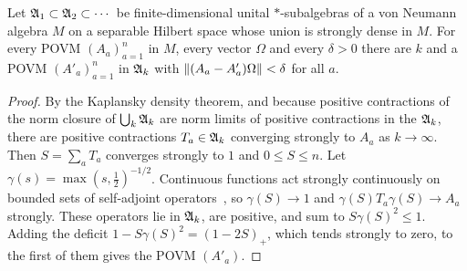 \begin{lemma}\label{lem:local}
Let $\mathfrak{A}_1\subset\mathfrak{A}_2\subset\cdots$ be finite-dimensional unital $*$-subalgebras of a von
Neumann algebra $M$ on a separable Hilbert space whose union is strongly dense in $M$. For every
POVM $(A_a)_{a=1}^n$ in $M$, every vector $\Omega$ and every $\delta>0$ there are $k$ and a POVM
$(A'_a)_{a=1}^n$ in $\mathfrak{A}_k$ with $\lVert (A_a-A'_a)\Omega\rVert<\delta$ for all $a$.
\end{lemma}

\begin{proof}
By the Kaplansky density theorem, and because positive contractions of the norm closure of
$\bigcup_k\mathfrak{A}_k$ are norm limits of positive contractions in the $\mathfrak{A}_k$, there are positive
contractions $T_a\in\mathfrak{A}_k$ converging strongly to $A_a$ as $k\to\infty$. Then $S=\sum_aT_a$
converges strongly to $1$ and $0\le S\le n$. Let $\gamma(s)=\max(s,\tfrac12)^{-1/2}$. Continuous
functions act strongly continuously on bounded sets of self-adjoint
operators~\cite{KadisonRingrose1}, so $\gamma(S)\to1$ and $\gamma(S)T_a\gamma(S)\to A_a$
strongly. These operators lie in $\mathfrak{A}_k$, are positive, and sum to $S\gamma(S)^2\le1$. Adding
the deficit $1-S\gamma(S)^2=(1-2S)_+$, which tends strongly to zero, to the first of them gives
the POVM $(A'_a)$.
\end{proof}

